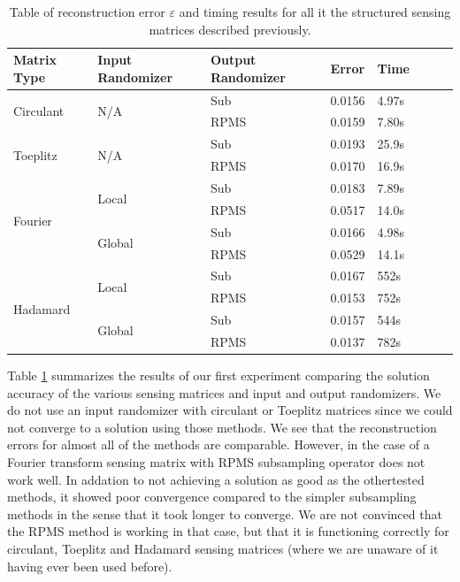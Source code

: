 \begin{table}[h] 
	\begin{tabular}{lll|lllll} 
		\textbf{Matrix Type}       & \textbf{Input Randomizer} & \textbf{Output Randomizer} & \textbf{Error} & \textbf{Time}  & \\ \hline
		\multirow{2}{*}{Circulant} & \multirow{2}{*}{N/A}      & Sub                        & 0.0156         & 4.97s          & \\
															 &											     & RPMS                       & 0.0159         & 7.80s          & \\ \hline
		\multirow{2}{*}{Toeplitz}  & \multirow{2}{*}{N/A}      & Sub                        & 0.0193         & 25.9s          & \\ 
															 &												   & RPMS                       & 0.0170         & 16.9s          & \\ \hline
		\multirow{4}{*}{Fourier}   & \multirow{2}{*}{Local}    & Sub                        & 0.0183         & 7.89s          & \\ 
															 &													 & RPMS                       & 0.0517         & 14.0s          & \\             
															 &	\multirow{2}{*}{Global}  & Sub                        & 0.0166         & 4.98s          & \\ 
															 &													 & RPMS                       & 0.0529         & 14.1s          & \\ \hline
		\multirow{4}{*}{Hadamard}  & \multirow{2}{*}{Local}    & Sub                        & 0.0167         & 552s           & \\
															 &						 							 & RPMS                       & 0.0153         & 752s           & \\
															 & \multirow{2}{*}{Global}   & Sub                        & 0.0157         & 544s           & \\
															 &													 & RPMS                       & 0.0137         & 782s           & \\
	\end{tabular} 
\caption{Table of reconstruction error $\varepsilon$ and timing results for all it the structured sensing matrices described previously.}
\label{tab:errors}
\end{table}

Table \ref{tab:errors} summarizes the results of our first experiment comparing
the solution accuracy of the various sensing matrices and input and output
randomizers. We do not use an input randomizer with circulant or Toeplitz
matrices since we could not converge to a solution using those methods. We see
that the reconstruction errors for almost all of the methods are comparable.
However, in the case of a Fourier transform sensing matrix with RPMS
subsampling operator does not work well. In addation to not achieving a
solution as good as the othertested methods, it showed poor convergence
compared to the simpler subsampling methods in the sense that it took longer to
converge. We are not convinced that the RPMS method is working in that case,
but that it is functioning correctly for circulant, Toeplitz and Hadamard
sensing matrices (where we are unaware of it having ever been used before). 

